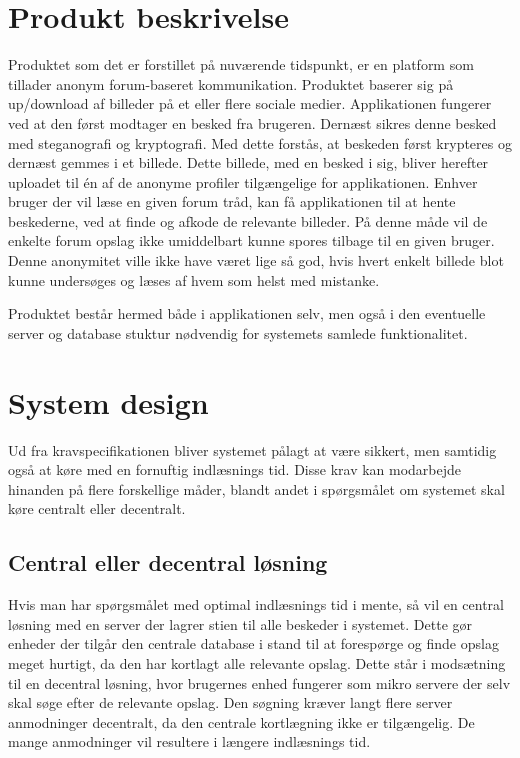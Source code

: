 \section{Produkt beskrivelse}
Produktet som det er forstillet på nuværende tidspunkt, er en platform som tillader anonym forum-baseret kommunikation. Produktet baserer sig på up/download af billeder på et eller flere sociale medier. Applikationen fungerer ved at den først modtager en besked fra brugeren. Dernæst sikres denne besked med steganografi og kryptografi. Med dette forstås, at beskeden først krypteres og dernæst gemmes i et billede. Dette billede, med en besked i sig, bliver herefter uploadet til én af de anonyme profiler tilgængelige for applikationen. Enhver bruger der vil læse en given forum tråd, kan få applikationen til at hente beskederne, ved at finde og afkode de relevante billeder. På denne måde vil de enkelte forum opslag ikke umiddelbart kunne spores tilbage til en given bruger. Denne anonymitet ville ikke have været lige så god, hvis hvert enkelt billede blot kunne undersøges og læses af hvem som helst med mistanke.

Produktet består hermed både i applikationen selv, men også i den eventuelle server og database stuktur nødvendig for systemets samlede funktionalitet.


\section{System design}
Ud fra kravspecifikationen bliver systemet pålagt at være sikkert, men samtidig også at køre med en fornuftig indlæsnings tid. Disse krav kan  modarbejde hinanden på flere forskellige måder, blandt andet i spørgsmålet om systemet skal køre centralt eller decentralt.

\subsection{Central eller decentral løsning}
Hvis man har spørgsmålet med optimal indlæsnings tid i mente, så vil en central løsning med en server der lagrer stien til alle beskeder i systemet. Dette gør enheder der tilgår den centrale database i stand til at forespørge og finde opslag meget hurtigt, da den har kortlagt alle relevante opslag. Dette står i modsætning til en decentral løsning, hvor brugernes enhed fungerer som mikro servere der selv skal søge efter de relevante opslag. Den søgning kræver langt flere server anmodninger decentralt, da den centrale kortlægning ikke er tilgængelig. De mange anmodninger vil resultere i længere indlæsnings tid.

